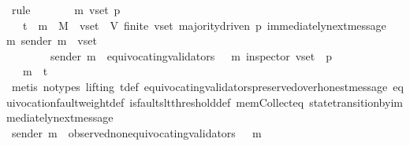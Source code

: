 \begin{isabellebody}
\ {\isacharparenleft}rule{\isacharplus}{\isacharparenright}\isanewline
{}\isamarkupfalse%
\ {\isacharminus}\ \isanewline
\ \ \isamarkupfalse%
\ {\isasymsigma}\ m\ v{\isacharunderscore}set\ p\isanewline
\ \ \isamarkupfalse%
\ {\isachardoublequoteopen}{\isasymsigma}\ {\isasymin}\ {\isasymSigma}t\ {\isasymand}\ m\ {\isasymin}\ M\ {\isasymand}\ v{\isacharunderscore}set\ {\isasymsubseteq}\ V{\isachardoublequoteclose}\ {\isachardoublequoteopen}finite\ v{\isacharunderscore}set{\isachardoublequoteclose}\ {\isachardoublequoteopen}majority{\isacharunderscore}driven\ p{\isachardoublequoteclose}\ {\isachardoublequoteopen}immediately{\isacharunderscore}next{\isacharunderscore}message\ {\isacharparenleft}{\isasymsigma}{\isacharcomma}\ m{\isacharparenright}{\isachardoublequoteclose}\ {\isachardoublequoteopen}sender\ m\ {\isasymin}\ v{\isacharunderscore}set{\isachardoublequoteclose}\ \isanewline
\ \ \ \ \ \ \ \ {\isachardoublequoteopen}sender\ m\ {\isasymnotin}\ equivocating{\isacharunderscore}validators\ {\isacharparenleft}{\isasymsigma}\ {\isasymunion}\ {\isacharbraceleft}m{\isacharbraceright}{\isacharparenright}{\isachardoublequoteclose}\ {\isachardoublequoteopen}inspector\ {\isacharparenleft}v{\isacharunderscore}set{\isacharcomma}\ {\isasymsigma}{\isacharcomma}\ p{\isacharparenright}{\isachardoublequoteclose}\ \isanewline
\ \ \isanewline
\ \ \isamarkupfalse%
\ \isamarkupfalse%
\ {\isachardoublequoteopen}{\isasymsigma}\ {\isasymunion}\ {\isacharbraceleft}m{\isacharbraceright}\ {\isasymin}\ {\isasymSigma}t{\isachardoublequoteclose}\isanewline
\ \ \ \ \isamarkupfalse%
\ {\isacharparenleft}metis\ {\isacharparenleft}no{\isacharunderscore}types{\isacharcomma}\ lifting{\isacharparenright}\ {\isasymSigma}t{\isacharunderscore}def\ equivocating{\isacharunderscore}validators{\isacharunderscore}preserved{\isacharunderscore}over{\isacharunderscore}honest{\isacharunderscore}message\ equivocation{\isacharunderscore}fault{\isacharunderscore}weight{\isacharunderscore}def\ is{\isacharunderscore}faults{\isacharunderscore}lt{\isacharunderscore}threshold{\isacharunderscore}def\ mem{\isacharunderscore}Collect{\isacharunderscore}eq\ state{\isacharunderscore}transition{\isacharunderscore}by{\isacharunderscore}immediately{\isacharunderscore}next{\isacharunderscore}message{\isacharparenright}\ \ \ \ \isanewline
\ \ \isamarkupfalse%
\ \isamarkupfalse%
\ {\isachardoublequoteopen}sender\ m\ {\isasymin}\ observed{\isacharunderscore}non{\isacharunderscore}equivocating{\isacharunderscore}validators\ {\isacharparenleft}{\isasymsigma}\ {\isasymunion}\ {\isacharbraceleft}m{\isacharbraceright}{\isacharparenright}{\isachardoublequoteclose}\isanewline

\end{isabellebody}

